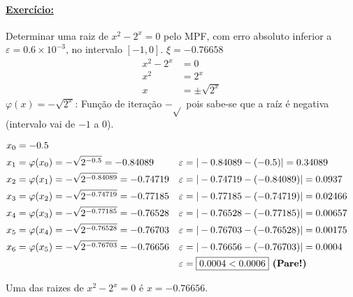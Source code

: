 \documentclass{article}
\begin{document}
        \paragraph{\underline{Exercício:}} Determinar uma raiz de $x^2 - 2^x = 0$ pelo MPF, com erro absoluto inferior a $\varepsilon = 0.6 \times 10^{-3}$, no intervalo $[-1, 0]$. $\xi = -0.76658$
        \begin{align*}
            x^2 - 2^x &= 0\\
            x^2 &= 2^x\\
            x & = \pm \sqrt{2^x}
        \end{align*}
        $\varphi(x) = -\sqrt{2^x}$: Função de iteração $-\sqrt{}$ pois sabe-se que a raíz é negativa (intervalo vai de $-1$ a $0$).

        \begin{align*}
            x_0 &= -0.5\\
            x_1 &= \varphi(x_0) = -\sqrt{2^{-0.5}} = -0.84089            &       \varepsilon &= |-0.84089 - (-0.5)| = 0.34089\\
            x_2 &= \varphi(x_1) = -\sqrt{2^{-0.84089}} = -0.74719        &       \varepsilon &= |-0.74719 - (-0.84089)| = 0.0937\\
            x_3 &= \varphi(x_2) = -\sqrt{2^{-0.74719}} = -0.77185        &       \varepsilon &= |-0.77185 - (-0.74719)| = 0.02466\\
            x_4 &= \varphi(x_3) = -\sqrt{2^{-0.77185}} = -0.76528        &       \varepsilon &= |-0.76528 - (-0.77185)| = 0.00657\\
            x_5 &= \varphi(x_4) = -\sqrt{2^{-0.76528}} = -0.76703        &       \varepsilon &= |-0.76703 - (-0.76528)| = 0.00175\\
            x_6 &= \varphi(x_5) = -\sqrt{2^{-0.76703}} = -0.76656        &       \varepsilon &= |-0.76656 - (-0.76703)| = 0.0004\\
            &                                                            &       \varepsilon &= \boxed{0.0004 < 0.0006} \text{\textbf{ (Pare!)}}\\
        \end{align*}

        Uma das raizes de $x^2 - 2^x = 0$ é $x = -0.76656$.
\end{document}
